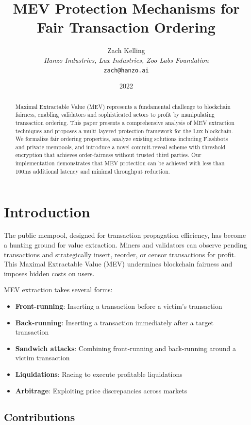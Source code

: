 \documentclass[11pt,a4paper]{article}
\title{MEV Protection Mechanisms for Fair Transaction Ordering}
\author{Zach Kelling\\
\textit{Hanzo Industries, Lux Industries, Zoo Labs Foundation}\\
\texttt{zach@hanzo.ai}}
\date{2022}
\theoremstyle{definition}
\begin{document}
\maketitle

\begin{abstract}
Maximal Extractable Value (MEV) represents a fundamental challenge to blockchain fairness, enabling validators and sophisticated actors to profit by manipulating transaction ordering. This paper presents a comprehensive analysis of MEV extraction techniques and proposes a multi-layered protection framework for the Lux blockchain. We formalize fair ordering properties, analyze existing solutions including Flashbots and private mempools, and introduce a novel commit-reveal scheme with threshold encryption that achieves order-fairness without trusted third parties. Our implementation demonstrates that MEV protection can be achieved with less than 100ms additional latency and minimal throughput reduction.
\end{abstract}

\section{Introduction}

The public mempool, designed for transaction propagation efficiency, has become a hunting ground for value extraction. Miners and validators can observe pending transactions and strategically insert, reorder, or censor transactions for profit. This Maximal Extractable Value (MEV) undermines blockchain fairness and imposes hidden costs on users.

MEV extraction takes several forms:
\begin{itemize}
    \item \textbf{Front-running}: Inserting a transaction before a victim's transaction
    \item \textbf{Back-running}: Inserting a transaction immediately after a target transaction
    \item \textbf{Sandwich attacks}: Combining front-running and back-running around a victim transaction
    \item \textbf{Liquidations}: Racing to execute profitable liquidations
    \item \textbf{Arbitrage}: Exploiting price discrepancies across markets
\end{itemize}

\subsection{Contributions}
\end{document}
